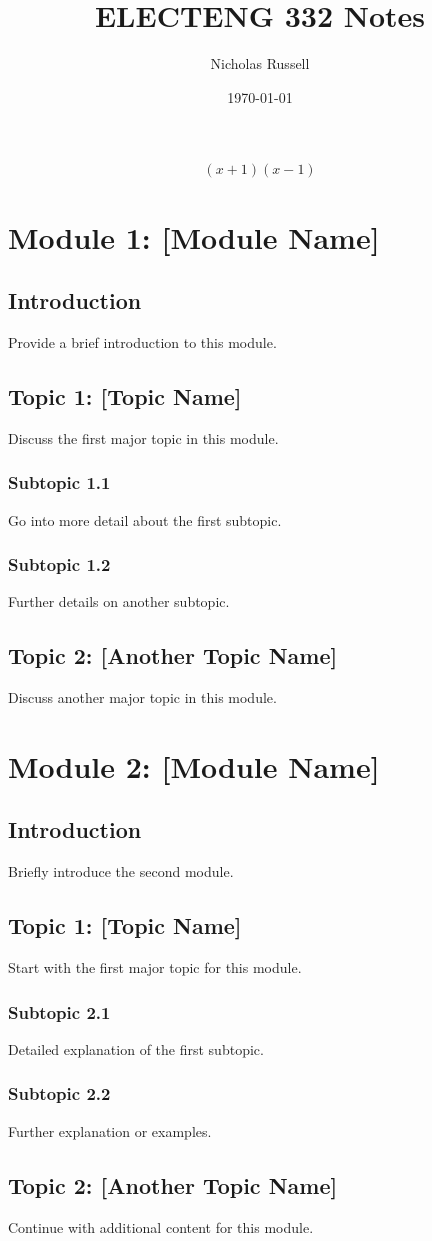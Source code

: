\documentclass[12pt]{report}
\title{ELECTENG 332 Notes}
\author{Nicholas Russell}
\date{\today}
\begin{document}
\maketitle
\tableofcontents
\newpage
$$ (x+1)(x-1) $$
\chapter{Module 1: [Module Name]}
\section{Introduction}
Provide a brief introduction to this module.

\section{Topic 1: [Topic Name]}
Discuss the first major topic in this module.

\subsection{Subtopic 1.1}
Go into more detail about the first subtopic.

\subsection{Subtopic 1.2}
Further details on another subtopic.

\section{Topic 2: [Another Topic Name]}
Discuss another major topic in this module.

\clearpage

\chapter{Module 2: [Module Name]}
\section{Introduction}
Briefly introduce the second module.

\section{Topic 1: [Topic Name]}
Start with the first major topic for this module.

\subsection{Subtopic 2.1}
Detailed explanation of the first subtopic.

\subsection{Subtopic 2.2}
Further explanation or examples.

\section{Topic 2: [Another Topic Name]}
Continue with additional content for this module.

\end{document}
